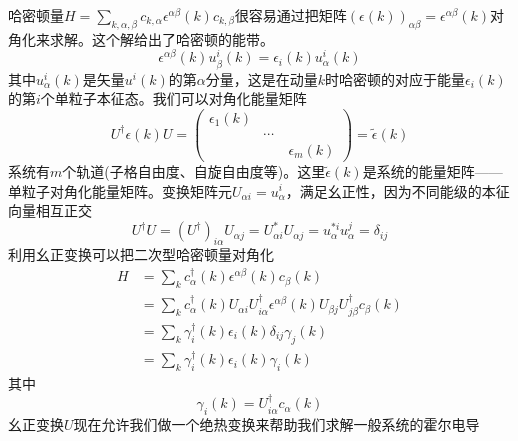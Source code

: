\documentclass{article}
\numberwithin{equation}{subsection}
\begin{document}
哈密顿量$H=\sum_{k,\alpha,\beta}c_{k,\alpha}\epsilon^{\alpha\beta}(k)c_{k,\beta}$很容易通过把矩阵$(\epsilon(k))_{\alpha\beta}=\epsilon^{\alpha\beta}(k)$对角化来求解。这个解给出了哈密顿的能带。
\begin{equation}
    \epsilon^{\alpha\beta}(k)u_{\beta}^{i}(k)=\epsilon_{i}(k)u_{\alpha}^{i}(k)
\end{equation}
其中$u_{\alpha}^{i}(k)$是矢量$u^i(k)$的第$\alpha$分量，这是在动量$k$时哈密顿的对应于能量$\epsilon_i(k)$的第$i$个单粒子本征态。我们可以对角化能量矩阵
\begin{equation}
    U^\dagger\epsilon(k)U=\begin{pmatrix}
        \epsilon_1(k)&\quad&\quad\\
        \quad&\cdots&\quad\\
        \quad&\quad&\epsilon_{m}(k)
    \end{pmatrix}=\tilde{\epsilon}(k)
\end{equation}
系统有$m$个轨道(子格自由度、自旋自由度等)。这里$\tilde{\epsilon}(k)$是系统的能量矩阵——单粒子对角化能量矩阵。变换矩阵元$U_{\alpha i}=u_\alpha^i$，满足幺正性，因为不同能级的本征向量相互正交
\begin{equation}
    U^\dagger U=(U^\dagger)_{i\alpha}U_{\alpha j}=U_{\alpha i}^*U_{\alpha j}=u_\alpha^{*i}u_{\alpha}^{j}=\delta_{ij}
\end{equation}
利用幺正变换可以把二次型哈密顿量对角化
\begin{equation}
    \begin{split}
        H&=\sum_{k}c_{\alpha}^\dagger(k)\epsilon^{\alpha\beta}(k)c_\beta(k)\\
        &=\sum_{k}c_{\alpha}^\dagger(k)U_{\alpha i}U_{i\alpha}^\dagger\epsilon^{\alpha\beta}(k)U_{\beta j}U_{j\beta}^\dagger c_\beta(k)\\
        &=\sum_{k}\gamma_i^\dagger(k)\epsilon_i(k)\delta_{ij}\gamma_j(k)\\
        &=\sum_{k}\gamma_i^\dagger(k)\epsilon_i(k)\gamma_i(k)
    \end{split}
\end{equation}
其中
\begin{equation}
    \gamma_i(k)=U_{i\alpha}^\dagger c_{\alpha}(k)
\end{equation}
幺正变换$U$现在允许我们做一个绝热变换来帮助我们求解一般系统的霍尔电导
\end{document}
